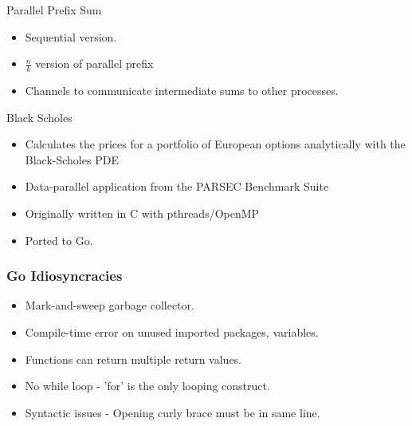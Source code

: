 \documentclass{beamer}
\begin{document}
\begin{frame} {Parallel Prefix Sum}
\begin{itemize}
  \item Sequential version.
  \item $\frac{n}{k}$ version of parallel prefix
  \item Channels to communicate intermediate sums to other processes.
\end{itemize}

\end{frame}

\begin{frame} {Black Scholes}
  \begin{itemize}
   \item Calculates the prices for a portfolio of European options analytically with the Black-Scholes PDE
   \item Data-parallel application from the PARSEC Benchmark Suite
   \item Originally written in C with pthreads/OpenMP
   \item Ported to Go.
	  
  \end{itemize}




\end{frame}

\begin{frame}
  \frametitle{Go Idiosyncracies}
  \begin{itemize}
   \item Mark-and-sweep garbage collector.
   \item Compile-time error on unused imported packages, variables.
   \item Functions can return multiple return values.
   \item No while loop - 'for' is the only looping construct.
   \item Syntactic issues - Opening curly brace must be in same line.
  \end{itemize}

\end{frame}
\end{document}
